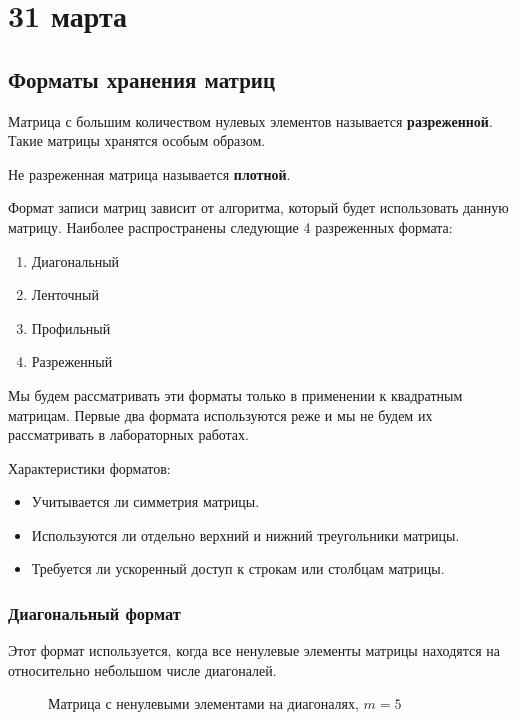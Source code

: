 \chapter{31 марта}

\section{Форматы хранения матриц}

\begin{definition}
    Матрица с большим количеством нулевых элементов называется \textbf{разреженной}. Такие матрицы хранятся особым образом.
\end{definition}
\begin{definition}
    Не разреженная матрица называется \textbf{плотной}.
\end{definition}

Формат записи матриц зависит от алгоритма, который будет использовать данную матрицу. Наиболее распространены следующие 4 разреженных формата:
\begin{enumerate}
    \item Диагональный
    \item Ленточный
    \item Профильный
    \item Разреженный
\end{enumerate}

Мы будем рассматривать эти форматы только в применении к квадратным матрицам. Первые два формата используются реже и мы не будем их рассматривать в лабораторных работах.

Характеристики форматов:
\begin{itemize}
    \item Учитывается ли симметрия матрицы.
    \item Используются ли отдельно верхний и нижний треугольники матрицы.
    \item Требуется ли ускоренный доступ к строкам или столбцам матрицы.
\end{itemize}

\subsection{Диагональный формат}

Этот формат используется, когда все ненулевые элементы матрицы находятся на относительно небольшом числе диагоналей.

\begin{figure}[h]
    \centering
    
    \caption{Матрица с ненулевыми элементами на диагоналях, \(m = 5\)}
\end{figure}

